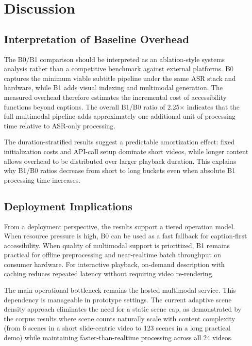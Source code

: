 \documentclass[conference]{IEEEtran}
\begin{document}
\FloatBarrier
\section{Discussion}
\subsection{Interpretation of Baseline Overhead}
The B0/B1 comparison should be interpreted as an ablation-style systems analysis rather than a competitive benchmark against external platforms. B0 captures the minimum viable subtitle pipeline under the same ASR stack and hardware, while B1 adds visual indexing and multimodal generation. The measured overhead therefore estimates the incremental cost of accessibility functions beyond captions. The overall B1/B0 ratio of 2.25$\times$ indicates that the full multimodal pipeline adds approximately one additional unit of processing time relative to ASR-only processing.

The duration-stratified results suggest a predictable amortization effect: fixed initialization costs and API-call setup dominate short videos, while longer content allows overhead to be distributed over larger playback duration. This explains why B1/B0 ratios decrease from short to long buckets even when absolute B1 processing time increases.

\subsection{Deployment Implications}
From a deployment perspective, the results support a tiered operation model. When resource pressure is high, B0 can be used as a fast fallback for caption-first accessibility. When quality of multimodal support is prioritized, B1 remains practical for offline preprocessing and near-realtime batch throughput on consumer hardware. For interactive playback, on-demand description with caching reduces repeated latency without requiring video re-rendering.

The main operational bottleneck remains the hosted multimodal service. This dependency is manageable in prototype settings. The current adaptive scene density approach eliminates the need for a static scene cap, as demonstrated by the corpus results where scene counts naturally scale with content complexity (from 6 scenes in a short slide-centric video to 123 scenes in a long practical demo) while maintaining faster-than-realtime processing across all 24 videos.
\end{document}
